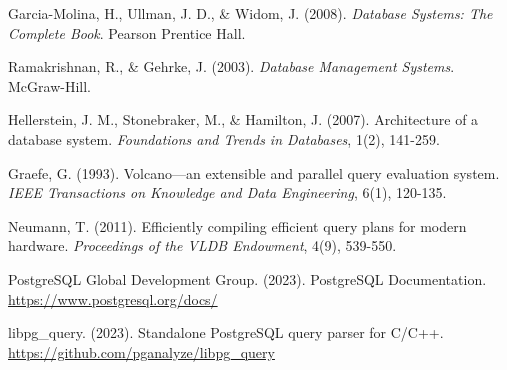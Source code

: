 \documentclass[12pt,a4paper]{article}
\begin{document}
    
    \begin{thebibliography}{99}

        Garcia-Molina, H., Ullman, J. D., \& Widom, J. (2008).
        \textit{Database Systems: The Complete Book}.
        Pearson Prentice Hall.

        Ramakrishnan, R., \& Gehrke, J. (2003).
        \textit{Database Management Systems}.
        McGraw-Hill.

        Hellerstein, J. M., Stonebraker, M., \& Hamilton, J. (2007).
        Architecture of a database system.
        \textit{Foundations and Trends in Databases}, 1(2), 141-259.

        Graefe, G. (1993).
        Volcano—an extensible and parallel query evaluation system.
        \textit{IEEE Transactions on Knowledge and Data Engineering}, 6(1), 120-135.

        Neumann, T. (2011).
        Efficiently compiling efficient query plans for modern hardware.
        \textit{Proceedings of the VLDB Endowment}, 4(9), 539-550.

        PostgreSQL Global Development Group. (2023).
        PostgreSQL Documentation.
        \url{https://www.postgresql.org/docs/}

        libpg\_query. (2023).
        Standalone PostgreSQL query parser for C/C++.
        \url{https://github.com/pganalyze/libpg_query}

    \end{thebibliography}
\end{document}
